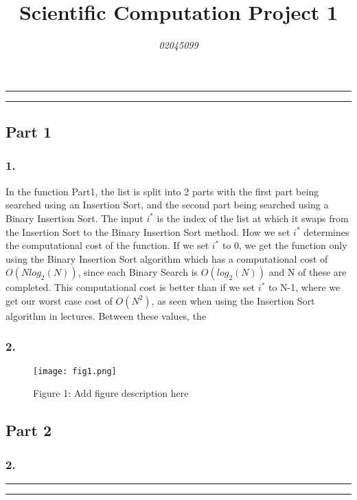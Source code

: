 \documentclass{article}
\title{Scientific Computation Project 1}
\author{\emph{02045099}}
\begin{document}
\maketitle

\hrule
\hrule

\subsection*{Part 1}


\subsubsection*{1.}
In the function Part1, the list is split into 2 parts with the first part being searched using an Insertion Sort, and the second part being searched using a Binary Insertion Sort. The input $i^*$ is the index of the list at which it swaps from the Insertion Sort to the Binary Insertion Sort method. How we set $i^*$ determines the computational cost of the function. If we set $i^*$ to 0, we get the function only using the Binary Insertion Sort algorithm which has a computational cost of $O(Nlog_{2}(N))$, since each Binary Search is $O(log_{2}(N))$ and N of these are completed. This computational cost is better than if we set $i^*$ to N-1, where we get our worst case cost of $O(N^2)$, as seen when using the Insertion Sort algorithm in lectures. Between these values, the 


\subsubsection*{2.}


\begin{figure}[h!]
\centering
\texttt{[image: fig1.png]}

\caption{Figure 1: Add figure description here}
\label{fig1}
\end{figure}





\vspace{0.25in}

\subsection*{Part 2}

\subsubsection*{2.}



\hrule
\hrule



\end{document}
